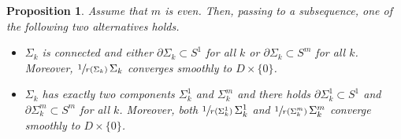 \documentclass[11pt]{amsart}
\newtheorem{prop}{Proposition}
\begin{document}
\begin{prop} \label{blowdown}
	Assume that $m$ is even. Then, passing to a subsequence, one of the following two alternatives holds.
	\begin{itemize}
		\item[$\circ$]$\Sigma_k$ is connected and either  $\partial \Sigma_k\subset S^1$ for all $k$  or  $\partial \Sigma_k\subset S^m$ for all $k$. Moreover, $\sfrac{1}{r(\Sigma_k)}\,\Sigma_k$ converges smoothly to $D\times \{0\}$.
		\item[$\circ$]$\Sigma_k$ has exactly two components $\Sigma^1_k$ and $\Sigma^m_k$ and there holds $\partial \Sigma^1_k\subset S^1$ and $\partial \Sigma^m_k\subset S^m$  for all $k$. Moreover, both $\sfrac{1}{r(\Sigma^1_k)}\,\Sigma^1_k$ and $\sfrac{1}{r(\Sigma^m_k)}\,\Sigma^m_k$ converge smoothly to $D\times \{0\}$.
		\end{itemize} 

	

	
	
	
	
\end{prop} 
\end{document}

